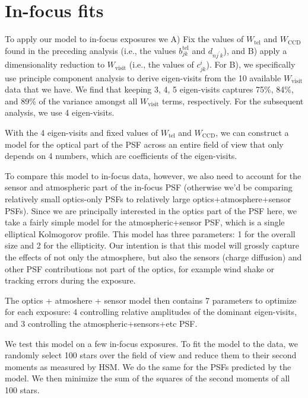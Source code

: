 \documentclass{article}
\begin{document}
\section{In-focus fits}

To apply our model to in-focus exposures we A) Fix the values of
$W_\mathrm{tel}$ and $W_\mathrm{CCD}$ found in the preceding analysis (i.e., the
values $b^\mathrm{tel}_{jk}$ and $d_{n j^\prime k}$), and B) apply a
dimensionality reduction to $W_\mathrm{visit}$ (i.e., the values of $c^i_{jk}$).
For B), we specifically use principle component analysis to derive eigen-visits
from the 10 available $W_\mathrm{visit}$ data that we have.  We find that
keeping 3, 4, 5 eigen-visits captures 75\%, 84\%, and 89\% of the variance
amongst all $W_\mathrm{visit}$ terms, respectively.  For the subsequent analysis,
we use 4 eigen-visits.

With the 4 eigen-visits and fixed values of $W_\mathrm{tel}$ and
$W_\mathrm{CCD}$, we can construct a model for the optical part of the PSF
across an entire field of view that only depends on 4 numbers, which are
coefficients of the eigen-visits.

To compare this model to in-focus data, however, we also need to account for the
sensor and atmospheric part of the in-focus PSF (otherwise we'd be comparing
relatively small optics-only PSFs to relatively large optics+atmosphere+sensor
PSFs).  Since we are principally interested in the optics part of the PSF here,
we take a fairly simple model for the atmospheric+sensor PSF, which is a single
elliptical Kolmogorov profile.  This model has three parameters: 1 for the
overall size and 2 for the ellipticity.  Our intention is that this model will
grossly capture the effects of not only the atmosphere, but also the sensors
(charge diffusion) and other PSF contributions not part of the optics, for
example wind shake or tracking errors during the exposure.

The optics + atmoshere + sensor model then contains 7 parameters to optimize for
each exposure: 4 controlling relative amplitudes of the dominant eigen-visits,
and 3 controlling the atmospheric+sensors+etc PSF.

We test this model on a few in-focus exposures.  To fit the model to the data,
we randomly select 100 stars over the field of view and reduce them to their
second moments as measured by HSM.  We do the same for the PSFs predicted by the
model.  We then minimize the sum of the squares of the second moments of all 100
stars.
\end{document}
